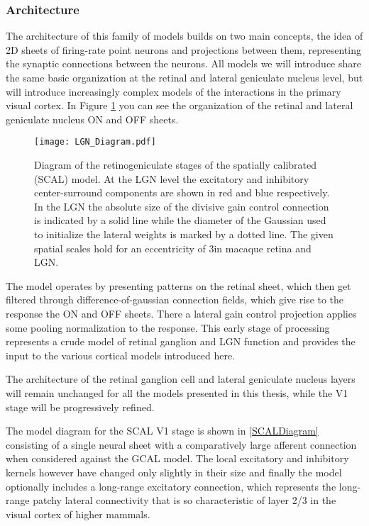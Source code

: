 \subsubsection{Architecture}

The architecture of this family of models builds on two main concepts,
the idea of 2D sheets of firing-rate point neurons and projections
between them, representing the synaptic connections between the
neurons. All models we will introduce share the same basic
organization at the retinal and lateral geniculate nucleus level, but
will introduce increasingly complex models of the interactions in the
primary visual cortex. In Figure \ref{LGNDiagram} you can see the
organization of the retinal and lateral geniculate nucleus ON and OFF
sheets.

\begin{figure}
	\centering
        \texttt{[image: LGN\_Diagram.pdf]}
	\caption[Diagram of the SCAL retinogeniculate stage.]{Diagram of
      the retinogeniculate stages of the spatially calibrated (SCAL)
      model. At the LGN level the excitatory and inhibitory
      center-surround components are shown in red and blue
      respectively. In the LGN the absolute size of the divisive gain
      control connection is indicated by a solid line while the
      diameter of the Gaussian used to initialize the lateral weights
      is marked by a dotted line. The given spatial scales hold for an
      eccentricity of 3\degree in macaque retina and LGN.}
	\label{LGNDiagram}
\end{figure}

The model operates by presenting patterns on the retinal sheet, which
then get filtered through difference-of-gaussian connection fields,
which give rise to the response the ON and OFF sheets. There a lateral
gain control projection applies some pooling normalization to the
response. This early stage of processing represents a crude model of
retinal ganglion and LGN function and provides the input to the
various cortical models introduced here.

The architecture of the retinal ganglion cell and lateral geniculate
nucleus layers will remain unchanged for all the models presented in
this thesis, while the V1 stage will be progressively refined.

The model diagram for the SCAL V1 stage is shown in \ref{SCALDiagram}
consisting of a single neural sheet with a comparatively large
afferent connection when considered against the GCAL model. The local
excitatory and inhibitory kernels however have changed only slightly
in their size and finally the model optionally includes a long-range
excitatory connection, which represents the long-range patchy lateral
connectivity that is so characteristic of layer 2/3 in the visual
cortex of higher mammals.

